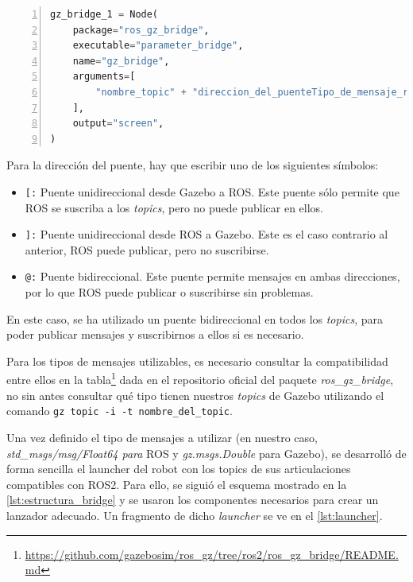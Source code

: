 \begin{lstlisting}[language=Python, caption={Estructura de un \texttt{gz\_bridge}}, label={lst:estructura_bridge}, numbers=left, backgroundcolor=\color{gray!10}]    
gz_bridge_1 = Node(
    package="ros_gz_bridge",
    executable="parameter_bridge",
    name="gz_bridge",
    arguments=[
        "nombre_topic" + "direccion_del_puenteTipo_de_mensaje_ros" + "direccion_del_puenteTipo_de_mensaje_gazebo"
    ],
    output="screen",
)
\end{lstlisting}

Para la dirección del puente, hay que escribir uno de los siguientes símbolos:

\begin{itemize}
  \item \texttt{[:} Puente unidireccional desde Gazebo a ROS. Este puente sólo permite que ROS se suscriba a los \textit{topics}, pero no puede publicar en ellos.
  \item \texttt{]:} Puente unidireccional desde ROS a Gazebo. Este es el caso contrario al anterior, ROS puede publicar, pero no suscribirse.
  \item \texttt{@:} Puente bidireccional. Este puente permite mensajes en ambas direcciones, por lo que ROS puede publicar o suscribirse sin problemas.
\end{itemize}

En este caso, se ha utilizado un puente bidireccional en todos los \textit{topics}, para poder publicar mensajes y suscribirnos a ellos si es necesario.

Para los tipos de mensajes utilizables, es necesario consultar la compatibilidad entre ellos en la tabla\footnote{\url{https://github.com/gazebosim/ros_gz/tree/ros2/ros_gz_bridge/README.md}} dada en el repositorio oficial del paquete \textit{ros\_gz\_bridge}, no sin antes consultar qué tipo tienen nuestros \textit{topics} de Gazebo utilizando el comando \texttt{gz topic -i -t nombre\_del\_topic}.

Una vez definido el tipo de mensajes a utilizar (en nuestro caso, \textit{std\_msgs/msg/Float64 para} ROS y \textit{gz.msgs.Double} para Gazebo), se desarrolló de forma sencilla el launcher del robot con los topics de sus articulaciones compatibles con ROS2. Para ello, se siguió el esquema mostrado en la \autoref{lst:estructura_bridge} y se usaron los componentes necesarios para crear un lanzador adecuado. Un fragmento de dicho \textit{launcher} se ve en el \autoref{lst:launcher}.

